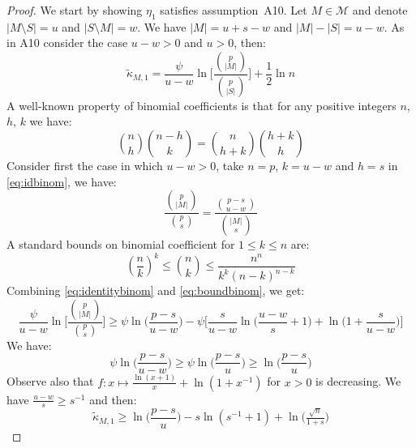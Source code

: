 \documentclass[aos]{imsart}
\theoremstyle{plain}
\newcommand{\M}{\mathcal{M}}
\begin{document}
\begin{proof}
    We start by showing $\eta_1$ satisfies assumption~A10. Let $M\in\M$ and denote $|M\setminus S|=u$ and $|S\setminus M|=w$. We have $|M|=u+s-w$ and $|M|-|S|=u-w$. As in A10 consider the case $u-w>0$ and $u>0$, then:
    \begin{equation*}
        \tilde{\kappa}_{M,1}=\frac{\psi}{u-w}\ln\bigg[\frac{{p \choose |M|}}{{p \choose |S|}}\bigg]+ \frac{1}{2}\ln n
    \end{equation*}
    A well-known property of binomial coefficients is that for any positive integers $n$, $h$, $k$ we have:
    \begin{equation}\label{eq:idbinom}
        \binom{n}{h}\binom{n-h}{k}=\binom{n}{h+k}\binom{h+k}{h}
    \end{equation}
    Consider first the case in which $u-w>0$, take $n=p$, $k=u-w$ and $h=s$ in \eqref{eq:idbinom}, we have:
    \begin{equation}\label{eq:identitybinom}
        \frac{{p \choose |M|}}{{p \choose s}}=
        \frac{{p -s \choose u-w}}{{|M| \choose s}}
    \end{equation}
A standard bounds on binomial coefficient for $1\leq k\leq n$ are:
\begin{equation}\label{eq:boundbinom}
  \left(\frac{n}{k}\right)^k \leq  {n \choose k} \leq \frac{n^n}{k^k(n-k)^{n-k}}
\end{equation}
Combining \eqref{eq:identitybinom} and \eqref{eq:boundbinom}, we get:
$$ \frac{\psi}{u-w}\ln\bigg[\frac{{p \choose |M|}}{{p \choose s}}\bigg] \geq \psi\ln\bigg(\frac{p-s}{u-w}\bigg)-\psi\bigg[\frac{s}{u-w}\ln\bigg(\frac{u-w}{s}+1\bigg) +\ln\bigg(1+\frac{s}{u-w}\bigg) \bigg]$$
We have:
$$\psi\ln\bigg(\frac{p-s}{u-w}\bigg) \geq \psi\ln\bigg(\frac{p-s}{u}\bigg) \geq \ln\bigg(\frac{p-s}{u}\bigg)$$
Observe also that $f:x \mapsto \frac{\ln(x+1)}{x}+\ln(1+{x}^{-1})$ for $x>0$ is decreasing. We have $\frac{u-w}{s} \geq s^{-1}$ and then: 
\begin{equation}\label{eq:lowerboundb1ebic2}
        \tilde{\kappa}_{M,1} \geq \ln\big(\frac{p-s}{u}\big)-s\ln(s^{-1}+1)+ \ln \big(\tfrac{\sqrt{n}}{1+s}\big)

\end{equation}
\end{proof}
\end{document}

